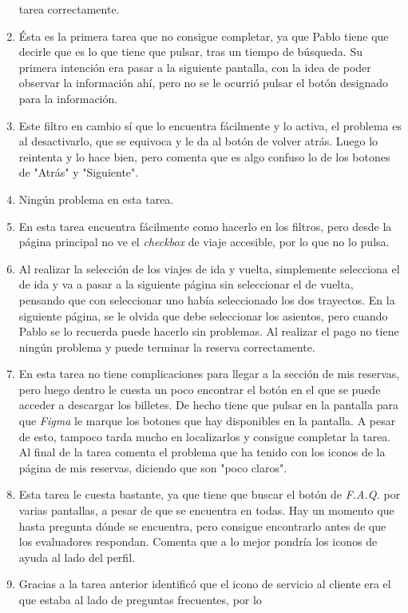 \begin{enumerate}
        tarea correctamente.
    \item Ésta es la primera tarea que no consigue completar, ya que Pablo tiene que decirle que es lo que tiene que pulsar, tras un tiempo
        de búsqueda. Su primera intención era pasar a la siguiente pantalla, con la idea de poder observar la información ahí, pero no se le
        ocurrió pulsar el botón designado para la información.
    \item Este filtro en cambio sí que lo encuentra fácilmente y lo activa, el problema es al desactivarlo, que se equivoca y le da al botón de
        volver atrás. Luego lo reintenta y lo hace bien, pero comenta que es algo confuso lo de los botones de "Atrás" y "Siguiente".
    \item Ningún problema en esta tarea.
    \item En esta tarea encuentra fácilmente como hacerlo en los filtros, pero desde la página principal no ve el \textit{checkbox} de viaje
        accesible, por lo que no lo pulsa.
    \item Al realizar la selección de los viajes de ida y vuelta, simplemente selecciona el de ida y va a pasar a la siguiente página sin seleccionar
        el de vuelta, pensando que con seleccionar uno había seleccionado los dos trayectos. En la siguiente página, se le olvida que debe seleccionar
        los asientos, pero cuando Pablo se lo recuerda puede hacerlo sin problemas. Al realizar el pago no tiene ningún problema y puede terminar
        la reserva correctamente.
    \item En esta tarea no tiene complicaciones para llegar a la sección de mis reservas, pero luego dentro le cuesta un poco encontrar el botón en el que
        se puede acceder a descargar los billetes. De hecho tiene que pulsar en la pantalla para que \textit{Figma} le marque los botones que hay disponibles
        en la pantalla. A pesar de esto, tampoco tarda mucho en localizarlos y consigue completar la tarea. Al final de la tarea comenta el problema que ha tenido
        con los iconos de la página de mis reservas, diciendo que son "poco claros".
    \item Esta tarea le cuesta bastante, ya que tiene que buscar el botón de \textit{F.A.Q.} por varias pantallas, a pesar de que se
        encuentra en todas. Hay un momento que hasta pregunta dónde se encuentra, pero consigue encontrarlo antes de que los evaluadores
        respondan. Comenta que a lo mejor pondría los iconos de ayuda al lado del perfil.
    \item Gracias a la tarea anterior identificó que el icono de servicio al cliente era el que estaba al lado de preguntas frecuentes, por lo

\end{enumerate}
